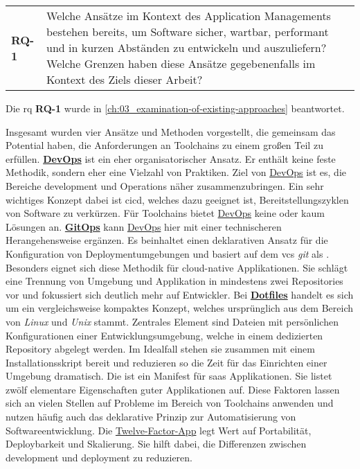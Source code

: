 \vspace{1em}
\begin{table}[H]
    \centering
    \begin{tabular}{p{} p{}}
        \textbf{RQ-1} & Welche Ansätze im Kontext des Application Managements bestehen bereits, um Software sicher, wartbar, performant und in kurzen Abständen zu entwickeln und auszuliefern? Welche Grenzen haben diese Ansätze gegebenenfalls im Kontext des Ziels dieser Arbeit? \\
    \end{tabular}
\end{table}

Die \acrlong{rq} \textbf{RQ-1} wurde in \autoref{ch:03_examination-of-existing-approaches} beantwortet.

Insgesamt wurden vier Ansätze und Methoden vorgestellt, die gemeinsam das Potential haben, die Anforderungen an Toolchains zu einem großen Teil zu erfüllen. \textbf{\hyperref[sec:03-01_devops]{DevOps}} ist ein eher organisatorischer Ansatz. Er enthält keine feste Methodik, sondern eher eine Vielzahl von Praktiken. Ziel von \hyperref[sec:03-01_devops]{DevOps} ist es, die Bereiche \Gls{development} und Operations näher zusammenzubringen. Ein sehr wichtiges Konzept dabei ist \acrfull{cicd}, welches dazu geeignet ist, Bereitstellungszyklen von Software zu verkürzen. Für Toolchains bietet \hyperref[sec:03-01_devops]{DevOps} keine oder kaum Lösungen an. \textbf{\hyperref[sec:03-03_gitops]{GitOps}} kann \hyperref[sec:03-01_devops]{DevOps} hier mit einer technischeren Herangehensweise ergänzen. Es beinhaltet einen deklarativen Ansatz für die Konfiguration von Deploymentumgebungen und basiert auf dem \acrfull{vcs} \textit{\Gls{git}} als . Besonders eignet sich diese Methodik für \gls{cloud-native} Applikationen. Sie schlägt eine Trennung von Umgebung und Applikation in mindestens zwei Repositories vor und fokussiert sich deutlich mehr auf Entwickler. Bei \textbf{\hyperref[sec:03-04_dotfiles]{Dotfiles}} handelt es sich um ein vergleichsweise kompaktes Konzept, welches ursprünglich aus dem Bereich von \textit{Linux} und \textit{Unix} stammt. Zentrales Element sind Dateien mit persönlichen Konfigurationen einer Entwicklungsumgebung, welche in einem dedizierten Repository abgelegt werden. Im Idealfall stehen sie zusammen mit einem Installationsskript bereit und reduzieren so die Zeit für das Einrichten einer Umgebung dramatisch. Die \textbf{} ist ein Manifest für \acrfull{saas} Applikationen. Sie listet zwölf elementare Eigenschaften guter Applikationen auf. Diese Faktoren lassen sich an vielen Stellen auf Probleme im Bereich von Toolchains anwenden und nutzen häufig auch das deklarative Prinzip zur Automatisierung von Softwareentwicklung. Die \hyperref[sec:03-05_concept-of-twelve-factor-app]{Twelve-Factor-App} legt Wert auf Portabilität, Deploybarkeit und Skalierung. Sie hilft dabei, die Differenzen zwischen \Gls{development} und \Gls{deployment} zu reduzieren.

